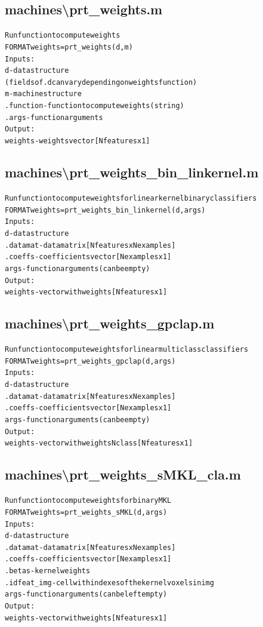 \subsection{machines\textbackslash prt\_weights.m}
\begin{alltt}

 Run function to compute weights
 FORMAT weights = prt\_weights(d,m)
 Inputs:
       d   - data structure
             (fields of .d can vary depending on weights function)
       m   - machine structure
           .function - function to compute weights (string)
           .args     - function arguments
 Output:
       weights - weights vector [Nfeatures x 1]
\end{alltt}


\subsection{machines\textbackslash prt\_weights\_bin\_linkernel.m}
\begin{alltt}

 Run function to compute weights for linear kernel binary classifiers
 FORMAT weights = prt\_weights\_bin\_linkernel (d,args)
 Inputs:
       d              - data structure
           .datamat   - data matrix [Nfeatures x Nexamples]
           .coeffs    - coefficients vector [Nexamples x 1]
       args           - function arguments (can be empty)
 Output:
       weights        - vector with weights [Nfeatures x 1]
\end{alltt}


\subsection{machines\textbackslash prt\_weights\_gpclap.m}
\begin{alltt}

 Run function to compute weights for linear multiclass classifiers
 FORMAT weights = prt\_weights\_gpclap (d,args)
 Inputs:
       d              - data structure
           .datamat   - data matrix [Nfeatures x Nexamples]
           .coeffs    - coefficients vector [Nexamples x 1]
       args           - function arguments (can be empty)
 Output:
       weights        - vector with weights {Nclass}[Nfeatures x 1]
\end{alltt}


\subsection{machines\textbackslash prt\_weights\_sMKL\_cla.m}
\begin{alltt}

 Run function to compute weights for binary MKL
 FORMAT weights = prt\_weights\_sMKL (d,args)
 Inputs:
       d               - data structure
           .datamat    - data matrix [Nfeatures x Nexamples]
           .coeffs     - coefficients vector [Nexamples x 1]
           .betas      - kernel weights
           .idfeat\_img - cell with indexes of the kernel voxels in img
       args            - function arguments (can be left empty)
 Output:
       weights         - vector with weights [Nfeatures x 1]
\end{alltt}


